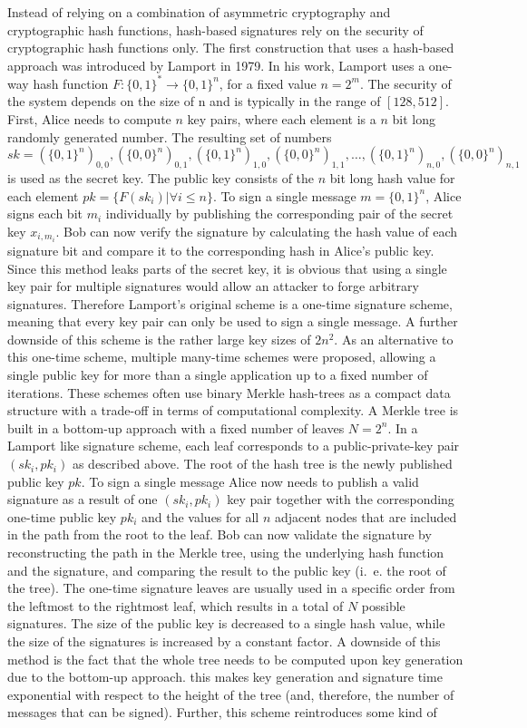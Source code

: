 Instead of relying on a combination of asymmetric cryptography and cryptographic hash functions, hash-based signatures rely on the security of cryptographic hash functions only. The first construction that uses a hash-based approach was introduced by Lamport in 1979\cite{lamport1979constructing}. In his work, Lamport uses a one-way hash function \(F: \{0,1\}^* \to \{0,1\}^n\), for a fixed value \(n = 2^m\). The security of the system depends on the size of n and is typically in the range of \([128,512]\). First, Alice needs to compute \(n\) key pairs, where each element is a \(n\) bit long randomly generated number. The resulting set of numbers 
\(sk = (\{0,1\}^n)_{0,0}, (\{0,0\}^n)_{0,1}, (\{0,1\}^n)_{1,0}, (\{0,0\}^n)_{1,1}, \dots, (\{0,1\}^n)_{n,0}, (\{0,0\}^n)_{n,1}\) is used as the secret key. The public key consists of the \(n\) bit long hash value for each element \(pk = \{F(sk_i) \vert \forall i \le n \}\). To sign a single message \(m = \{0,1\}^n\), Alice signs each bit \(m_i\) individually by publishing the corresponding pair of the secret key \(x_{i,m_i}\). Bob can now verify the signature by calculating the hash value of each signature bit and compare it to the corresponding hash in Alice's public key. Since this method leaks parts of the secret key, it is obvious that using a single key pair for multiple signatures would allow an attacker to forge arbitrary signatures. Therefore Lamport's original scheme is a one-time signature scheme, meaning that every key pair can only be used to sign a single message. A further downside of this scheme is the rather large key sizes of \(2n^2\). As an alternative to this one-time scheme, multiple many-time schemes were proposed, allowing a single public key for more than a single application up to a fixed number of iterations. These schemes often use binary Merkle hash-trees as a compact data structure with a trade-off in terms of computational complexity. A Merkle tree is built in a bottom-up approach with a fixed number of leaves \(N=2^n\). In a Lamport like signature scheme, each leaf corresponds to a public-private-key pair \((sk_i, pk_i) \) as described above. The root of the hash tree is the newly published public key \(pk\). To sign a single message Alice now needs to publish a valid signature as a result of one \((sk_i,pk_i)\) key pair together with the corresponding one-time public key \(pk_i\) and the values for all \(n\) adjacent nodes that are included in the path from the root to the leaf. Bob can now validate the signature by reconstructing the path in the Merkle tree, using the underlying hash function and the signature, and comparing the result to the public key (i.~e. the root of the tree). The one-time signature leaves are usually used in a specific order from the leftmost to the rightmost leaf, which results in a total of \(N\) possible signatures. The size of the public key is decreased to a single hash value, while the size of the signatures is increased by a constant factor. A downside of this method is the fact that the whole tree needs to be computed upon key generation due to the bottom-up approach. this makes key generation and signature time exponential with respect to the height of the tree (and, therefore, the number of messages that can be signed). Further, this scheme reintroduces some kind of 